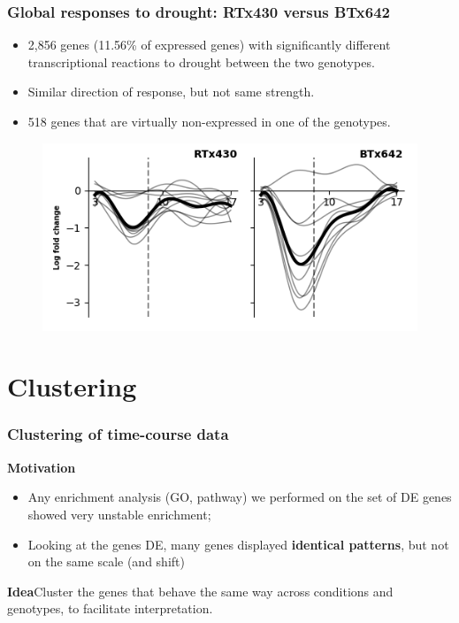 \documentclass[xcolor=dvipsnames]{beamer}
\begin{document}
\begin{frame}
\frametitle{Global responses to drought: RTx430 versus BTx642}
\begin{itemize}[label={$\bullet$}]
\item 2,856 genes (11.56\% of expressed genes) with significantly different
transcriptional reactions to drought between the two genotypes.
\item Similar direction of response, but not same strength.
\item 518 genes that are virtually non-expressed in one of the genotypes.
\end{itemize}
\begin{center}
\begin{figure}
\includegraphics[width=0.6\linewidth]{figures/figure_2/geno_phenalynine.png}
\end{figure}
\end{center}
\end{frame}


\section{Clustering}

\begin{frame}
\frametitle{Clustering of time-course data}

{\color{Blue} \bf Motivation}
\begin{itemize}[label={$\bullet$}]
\item Any enrichment analysis (GO, pathway) we performed on the set of DE
genes showed very unstable enrichment;
\item Looking at the genes DE, many genes
displayed {\bf identical patterns}, but not on the same scale (and shift)
\end{itemize}

\vspace{2em}

{\color{Blue} \bf Idea}\quad Cluster the genes that behave the same way across
conditions and genotypes, to facilitate interpretation.

\end{frame}
\end{document}
